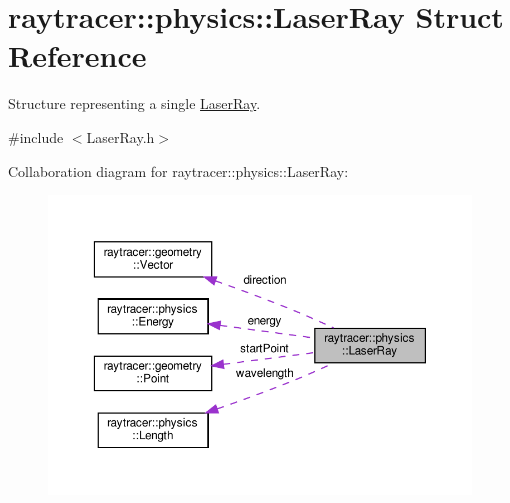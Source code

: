 \hypertarget{structraytracer_1_1physics_1_1LaserRay}{}\section{raytracer\+:\+:physics\+:\+:Laser\+Ray Struct Reference}
\label{structraytracer_1_1physics_1_1LaserRay}


Structure representing a single \hyperlink{structraytracer_1_1physics_1_1LaserRay}{Laser\+Ray}.  




{\ttfamily \#include $<$Laser\+Ray.\+h$>$}



Collaboration diagram for raytracer\+:\+:physics\+:\+:Laser\+Ray\+:\nopagebreak
\begin{figure}[H]
\begin{center}
\leavevmode
\includegraphics[width=350pt]{structraytracer_1_1physics_1_1LaserRay__coll__graph}
\end{center}
\end{figure}
